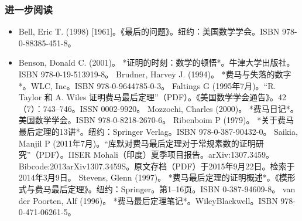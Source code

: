 \subsubsection{进一步阅读} 
\begin{itemize}
\item Bell, Eric T. (1998) [1961]。《最后的问题》。纽约：美国数学学会。ISBN 978-0-88385-451-8。  
\item Benson, Donald C. (2001)。 *证明的时刻：数学的顿悟*。牛津大学出版社。ISBN 978-0-19-513919-8。  
Brudner, Harvey J. (1994)。 *费马与失落的数字*。WLC, Inc。ISBN 978-0-9644785-0-3。  
Faltings G (1995年7月)。“R. Taylor 和 A. Wiles 证明费马最后定理”（PDF）。《美国数学学会通告》。42（7）：743–746。ISSN 0002-9920。  
Mozzochi, Charles (2000)。 *费马日记*。美国数学学会。ISBN 978-0-8218-2670-6。  
Ribenboim P (1979)。 *关于费马最后定理的13讲*。纽约：Springer Verlag。ISBN 978-0-387-90432-0。  
Saikia, Manjil P (2011年7月)。“库默对费马最后定理对于常规素数的证明研究”（PDF）。IISER Mohali（印度）夏季项目报告。arXiv:1307.3459。Bibcode:2013arXiv1307.3459S。原文存档（PDF）于2015年9月22日。检索于2014年3月9日。  
Stevens, Glenn (1997)。 *费马最后定理的证明概述*。《模形式与费马最后定理》。纽约：Springer。第1–16页。ISBN 0-387-94609-8。  
van der Poorten, Alf (1996)。 *费马最后定理笔记*。WileyBlackwell。ISBN 978-0-471-06261-5。
\end{itemize}